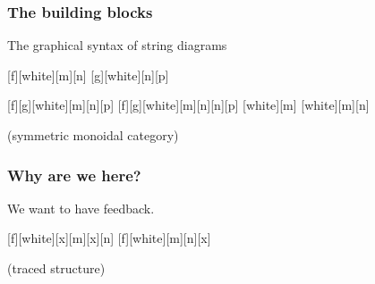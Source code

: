 \begin{frame}
    \frametitle{The building blocks}

    \centering

    \pause
    \LARGE
    The graphical syntax of \alert{string diagrams}

    \pause
    \normalsize
    \vspace{2em}

    [f][white][m][n]
    [g][white][n][p]

    \pause
    \vspace{2em}

    [f][g][white][m][n][p]
    [f][g][white][m][n][n][p]
    \pause
    [white][m]
    [white][m][n]

    \normalsize
    \vspace{1em}

    (\alert{symmetric monoidal category})

\end{frame}
\begin{frame}
    \frametitle{Why are we here?}

    \centering
    \LARGE
    We want to have \alert{feedback}.

    \pause
    \normalsize
    \vspace{2em}

    [f][white][x][m][x][n]
    \quad
    \pause
    \scalebox{2}{\(\Rightarrow\)}
    \quad
    [f][white][m][n][x]

    \pause
    \vspace{1em}
    (traced structure)

\end{frame}
